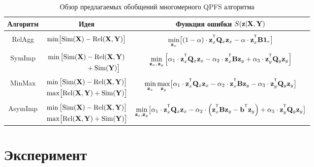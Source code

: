 \begin{table}[ht]
	\centering
	\caption{Обзор предлагаемых обобщений многомерного QPFS алгоритма}
	\small{
		\begin{tabular}{c|c|c}
			\hline
			Алгоритм & Идея & Функция ошибки $S(\mathbf{z} | \mathbf{X}, \mathbf{Y})$ \\
			\hline && \\ [-.5em]
			RelAgg & $\min \bigl[ \text{Sim}(\mathbf{X}) - \text{Rel}(\mathbf{X}, \mathbf{Y}) \bigr] $ & $\min\limits_{\bz_x} \bigl[ (1 - \alpha) \cdot \bz_x^{\T} \bQ_x \bz_x - \alpha \cdot \bz_x^{\T} \bB \bOne_r \bigr] $ \\ &&\\[-.5em]
			SymImp & $\begin{aligned} \min \, \bigl[ \text{Sim}(\mathbf{X}) & - \text{Rel}(\mathbf{X}, \mathbf{Y}) \\ & + \text{Sim}(\mathbf{Y}) \bigr] \end{aligned}$ & $ \min\limits_{\bz_x, \, \bz_y} \left[ \alpha_1 \cdot \bz_x^{\T} \bQ_x \bz_x - \alpha_2 \cdot \bz_x^{\T} \bB \bz_y + \alpha_3 \cdot \bz_y^{\T} \bQ_y \bz_y \right] $\\ &&\\ [-.5em]
			MinMax & $\begin{aligned} &\min \, \bigl[ \text{Sim}(\mathbf{X}) - \text{Rel}(\mathbf{X}, \mathbf{Y}) \bigr]  \\ & \max \bigl[\text{Rel}(\mathbf{X}, \mathbf{Y}) + \text{Sim}(\mathbf{Y}) \bigr] \end{aligned}$ & $	\min\limits_{\bz_x} 	\max\limits_{\bz_y} \bigl[\alpha_1 \cdot \bz_x^{\T} \bQ_x \bz_x - \alpha_2 \cdot \bz_x^{\T} \bB \bz_y - \alpha_3 \cdot \bz_y^{\T} \bQ_y \bz_y \bigr]$ \\ &&\\ [-.5em]
			AsymImp & $\begin{aligned} & \min \, \bigl[ \text{Sim}(\mathbf{X}) - \text{Rel}(\mathbf{X}, \mathbf{Y}) \bigr]\\ &  \max \bigl[\text{Rel}(\mathbf{X}, \mathbf{Y}) + \text{Sim}(\mathbf{Y}) \bigr] \end{aligned}$ & $\min\limits_{\bz_x, \bz_y} \bigl[ \alpha_1 \cdot \bz_x^{\T} \bQ_x \bz_x - \alpha_2 \cdot \left(\bz_x^{\T} \bB \bz_y - \bb^{\T} \bz_y \right) + \alpha_3 \cdot \bz_y^{\T} \bQ_y \bz_y \bigr]$\\ 
			\hline
	\end{tabular}}
	\label{ch2:tbl:summary}
\end{table}


\section{Эксперимент}

